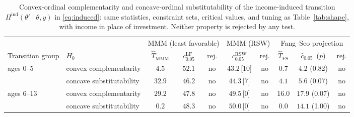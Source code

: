 \begin{table}[htbp]
\centering\small
\begin{tabular}{@{}llcccccccc@{}}
\toprule
 & & \multicolumn{3}{c}{MMM (least favorable)} & \multicolumn{2}{c}{MMM (RSW)} & \multicolumn{3}{c}{Fang--Seo projection} \\
\cmidrule(lr){3-5}\cmidrule(lr){6-7}\cmidrule(lr){8-10}
Transition group & $H_0$ & $\hat T_{\mathrm{MMM}}$ & $c^{\mathrm{LF}}_{0.05}$ & rej. & $c^{\mathrm{RSW}}_{0.05}$ & rej. & $\hat T_{\mathrm{FS}}$ & $\hat c_{0.05}$ \,($p$) & rej. \\ \midrule
ages 0--5 & convex complementarity & $4.5$ & $52.1$ & no & $43.2$\,[10] & no & $0.7$ & $4.2$ (0.82) & no \\
 & concave substitutability & $32.9$ & $46.2$ & no & $44.3$\,[7] & no & $4.1$ & $5.6$ (0.07) & no \\
\midrule
ages 6--13 & convex complementarity & $29.2$ & $47.8$ & no & $49.5$\,[0] & no & $16.0$ & $17.9$ (0.07) & no \\
 & concave substitutability & $0.2$ & $48.3$ & no & $50.0$\,[0] & no & $0.0$ & $14.1$ (1.00) & no \\
\bottomrule
\end{tabular}
\caption{Convex-ordinal complementarity and concave-ordinal substitutability of the income-induced
transition $\Pi^{\mathrm{ind}}(\theta'\mid\theta,y)$ in \eqref{eq:induced}: same
statistics, constraint sets, critical values, and tuning as Table~\ref{tab:shape}, with
income in place of investment. Neither property is rejected by any test.}
\label{tab:shape_induced}
\end{table}
